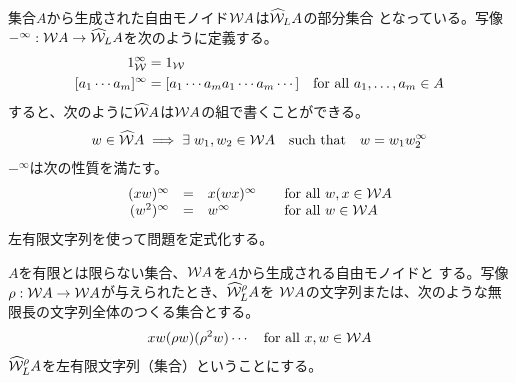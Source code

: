 	集合$A$から生成された自由モノイド${{\mathcal{W}}} A$は$\widehat{{{\mathcal{W}}}}_L A$の部分集合
	となっている。写像$-^\infty:{{\mathcal{W}}} A\to\widehat{{{\mathcal{W}}}}_L A$を次のように定義する。
	\begin{equation*}\begin{split}
		1_{{\mathcal{W}}}^\infty &= 1_{{\mathcal{W}}} \\
		[a_1\cdots a_m]^\infty &= [a_1\cdots a_ma_1\cdots a_m\cdots]
		\quad\text{for all }a_1,\dots,a_m\in A
	\end{split}\end{equation*}
	すると、次のように$\widehat{{{\mathcal{W}}}} A$は${{\mathcal{W}}} A$の組で書くことができる。
	\begin{equation*}\begin{split}
		w\in\widehat{{{\mathcal{W}}}} A \implies \exists\;w_1,w_2\in{\ensuremath{{\mathcal{W}}}} A
		\quad\text{such that}\quad w = w_1w_2^\infty
	\end{split}\end{equation*}
	$-^\infty$は次の性質を満たす。
	{\setlength\arraycolsep{2pt}
	\begin{equation*}\begin{array}{rcll}
		(xw)^\infty &=& x(wx)^\infty &\quad\text{for all }w,x\in{\ensuremath{{\mathcal{W}}}} A \\
		(w^2)^\infty &=& w^\infty &\quad\text{for all }w\in {\ensuremath{{\mathcal{W}}}} A
	\end{array}\end{equation*}
	}
	左有限文字列を使って問題を定式化する。

	\begin{definition}[周期的な無限長文字列その二]
	\label{def:周期的な無限長文字列その二} %
		$A$を有限とは限らない集合、${{\mathcal{W}}} A$を$A$から生成される自由モノイドと
		する。写像$\rho:{{\mathcal{W}}} A\to{\ensuremath{{\mathcal{W}}}} A$が与えられたとき、$\widehat{{{\mathcal{W}}}}_L^\rho A$を
		${{\mathcal{W}}} A$の文字列または、次のような無限長の文字列全体のつくる集合とする。
		\begin{equation*}\begin{split}
			xw(\rho w)(\rho^2 w)\cdots \quad\text{for all }x,w\in{\ensuremath{{\mathcal{W}}}} A
		\end{split}\end{equation*}
		$\widehat{{{\mathcal{W}}}}_L^\rho A$を左有限文字列（集合）ということにする。
	\end{definition} %

	\begin{definition}\label{def:def name} %
	\end{definition} %

